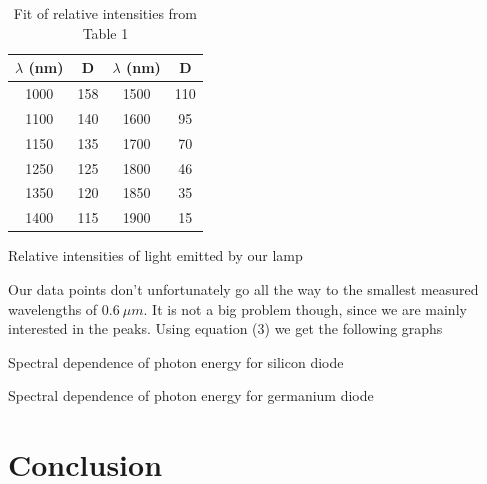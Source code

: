 \documentclass[a4paper,11pt]{article}
\begin{document}
\begin{table}[htpb]
    \begin{minipage}[b]{.45\linewidth}
        \centering
        \begin{tabular}{c c c c}
            $ \lambda $ (nm) & D & $ \lambda $ (nm) & D \\ 
            \hline\hline
            1000 & 158 & 1500 & 110 \\
            1100 & 140 & 1600 & 95 \\
            1150 & 135 & 1700 & 70 \\
            1250 & 125 & 1800 & 46 \\
            1350 & 120 & 1850 & 35 \\
            1400 & 115 & 1900 & 15 \\
        \end{tabular}
        \caption{Relative intensities of light emitted by our lamp}

    \end{minipage} 
    \hfill
    \begin{minipage}[b]{.49\linewidth}
        \centering
        \resizebox{\textwidth}{!}{  }
        \captionsetup{type=graph}
        \caption{Fit of relative intensities from Table 1}
    \end{minipage} 
\end{table}

Our data points don't unfortunately go all the way to the smallest measured wavelengths of $ 0.6 \ \mu m $. It is not a big problem though, since we are mainly interested in the peaks. Using equation (3) we get the following graphs

\begin{table}[htpb]
    \begin{minipage}[b]{.45\linewidth}
        \centering
        \resizebox{\textwidth}{!}{  }
        \captionsetup{type=graph}
        \caption{Spectral dependence of photon energy for silicon diode }
    \end{minipage} 
    \hfill
    \begin{minipage}[b]{.45\linewidth}
        \centering
        \resizebox{\textwidth}{!}{  }
        \captionsetup{type=graph}
        \caption{Spectral dependence of photon energy for germanium diode }
    \end{minipage} 
\end{table}

\section{Conclusion}
\end{document}
